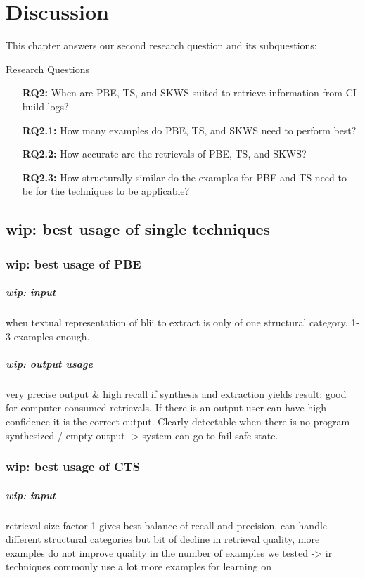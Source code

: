 \documentclass[\myrootdir/main.tex]{subfiles}
\begin{document}
\chapter{Discussion}

This chapter answers our second research question and its subquestions:
\begin{simplebox}{Research Questions}
\begin{itemize}
  \item[\textbf{RQ2:}] When are PBE, TS, and SKWS suited to retrieve information from CI build logs?
  \item[\textbf{RQ2.1:}] How many examples do PBE, TS, and SKWS need to perform best?
  \item[\textbf{RQ2.2:}] How accurate are the retrievals of PBE, TS, and SKWS?
  \item[\textbf{RQ2.3:}] How structurally similar do the examples for PBE and TS need to be for the techniques to be applicable?
\end{itemize}
\end{simplebox}

\section{wip: best usage of single techniques}


\subsection{wip: best usage of PBE}
\paragraph{wip: input}
when textual representation of blii to extract is only of one structural category. 1-3 examples enough.
\paragraph{wip: output usage}
very precise output & high recall if synthesis and extraction yields result: good for computer consumed retrievals.
If there is an output user can have high confidence it is the correct output.
Clearly detectable when there is no program synthesized / empty output -> system can go to fail-safe state.

\subsection{wip: best usage of CTS}
\paragraph{wip: input}
retrieval size factor 1 gives best balance of recall and precision, can handle different structural categories but bit of decline in retrieval quality, more examples do not improve quality in the number of examples we tested -> ir techniques commonly use a lot more examples for learning on
\end{document}
